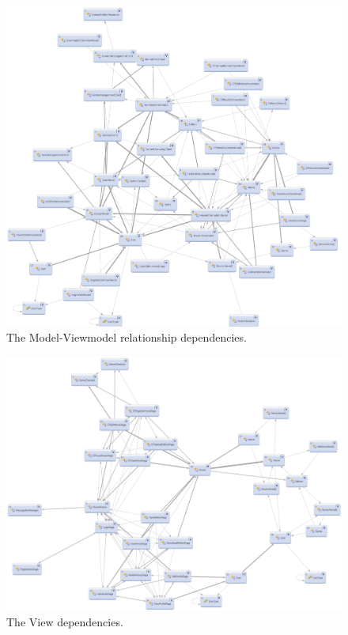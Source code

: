 \begin{figure}[!ht]
  \centering
    \includegraphics[width=\textwidth]{Parts/Appendix/Images/Implementation/ModelViewModel}
  \caption{The Model-Viewmodel relationship dependencies.}
  \label{fig:Appendix_Diagrams_Class_Client_ModelViewModel}
\end{figure}

\begin{figure}[!ht]
  \centering
    \includegraphics[width=\textwidth]{Parts/Appendix/Images/Implementation/View}
  \caption{The View dependencies.}
  \label{fig:Appendix_Diagrams_Class_Client_View}
\end{figure}

